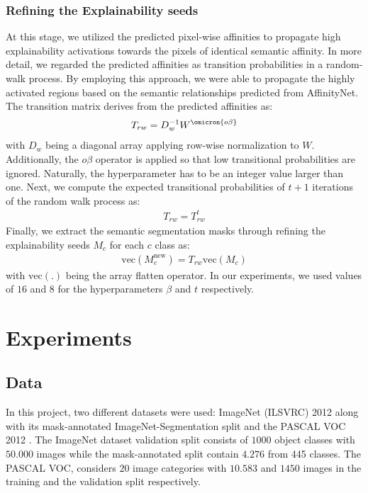 \subsubsection{Refining the Explainability seeds}
At this stage, we utilized the predicted pixel-wise affinities to propagate high explainability activations towards the pixels of identical semantic affinity. In more detail, we regarded the predicted affinities as transition probabilities in a random-walk process. By employing this approach, we were able to propagate the highly activated regions based on the semantic relationships predicted from AffinityNet. The transition matrix derives from the predicted affinities as: 
\begin{align*}
\label{eq:dropweight}
T_{rw}=D_w^{-1}W^\omicron{o\beta}
\end{align*}
with $D_w$ being a diagonal array applying row-wise normalization to $W$. Additionally, the $o\beta$ operator is applied so that low transitional probabilities are ignored. Naturally, the \byta hyperparameter has to be an integer value larger than one. Next, we compute the expected transitional probabilities of $t+1$ iterations of the random walk process as:
\begin{align*}
\label{eq:dropweight}
T_{rw}=T_{rw}^t
\end{align*}
Finally, we extract the semantic segmentation masks through refining the explainability seeds $M_c$ for each $c$ class as:
\begin{align*}
\label{eq:dropweight}
\text{vec}(M_c^\text{new})=T_{rw}\text{vec}(M_c)
\end{align*}
with $\text{vec}(.)$ being the array flatten operator. In our experiments, we used values of $16$ and $8$ for the hyperparameters $\beta$ and $t$ respectively.


\section{Experiments}

\subsection{Data}

In this project, two different datasets were used: ImageNet \cite{russakovsky2015ImageNet} (ILSVRC) 2012 along with its mask-annotated ImageNet-Segmentation \cite{imagenet-seg} split and the PASCAL VOC 2012 \cite{Everingham15}. The ImageNet dataset validation split consists of $1000$ object classes with $50.000$ images while the mask-annotated split contain $4.276$ from 445 classes. The PASCAL VOC, considers $20$ image categories with $10.583$ and $1450$ images in the training and the validation split respectively.



